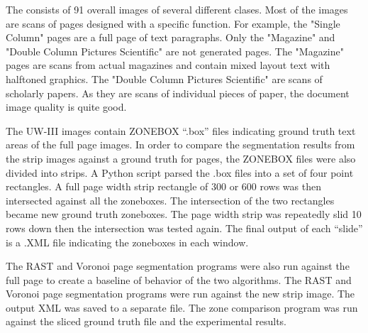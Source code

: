 \documentclass[conference]{IEEEtran}
\begin{document}
The \cite{winder2010extending} consists of 91 overall images of several
different clases. Most of the images are scans of pages designed with a
specific function. For example, the "Single Column" pages are a full page of
text paragraphs. Only the "Magazine" and "Double Column Pictures Scientific"
are not generated pages. The "Magazine" pages are scans from actual magazines
and contain mixed layout text with halftoned graphics. The "Double Column
Pictures Scientific" are scans of scholarly papers.  As they are scans of
individual pieces of paper, the document image quality is quite good.



The UW-III images contain ZONEBOX “.box” files indicating ground truth text
areas of the full page images. In order to compare the segmentation results from the strip images against a 
ground truth for pages, the ZONEBOX files were also divided into strips. A Python script
parsed the .box files into a set of four point rectangles. A full page width
strip rectangle of 300 or 600 rows was then intersected against all the
zoneboxes. The intersection of the two rectangles became new ground truth
zoneboxes. The page width strip was repeatedly slid 10 rows down then the
intersection was tested again. The final output of each “slide” is a .XML file
indicating the zoneboxes in each window.

The RAST and Voronoi page segmentation programs were also run against the full page
to create a baseline of behavior of the two algorithms.  
The RAST and Voronoi page segmentation programs were run against the new strip
image. The output XML was saved to a separate file. The zone comparison program
was run against the sliced ground truth file and the experimental results. 
\end{document}
